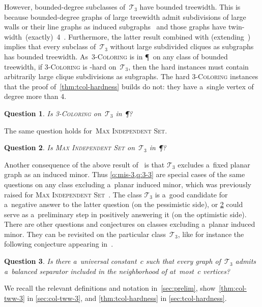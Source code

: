 \documentclass[a4paper,USenglish,cleveref,hyperref,autoref]{lipics-v2021}
\newcommand{\mis}{\textsc{Max Independent Set}\xspace}
\newcommand{\tcol}{\textsc{3-Coloring}\xspace}
\newtheorem{question}{Question}%
\begin{document}
However, bounded-degree subclasses of~$\mathcal T_3$ have bounded treewidth. 
This is because bounded-degree graphs of large treewidth admit subdivisions of large walls or their line graphs as induced subgraphs~\cite{Korhonen23} and those graphs have twin-width~(exactly)~4~\cite{Ahn25}.
Furthermore, the latter result combined with \cite{Abrishami24,Bonnet25} (extending~\cite{Korhonen23}) implies that every subclass of~$\mathcal T_3$ without large subdivided cliques as subgraphs has bounded treewidth.
As~\tcol is in \P\ on any class of bounded treewidth, if \tcol is \NP-hard on~$\mathcal T_3$, then the hard instances must contain arbitrarily large clique subdivisions as subgraphs. 
The hard \tcol instances that the proof of~\cref{thm:tcol-hardness} builds do not: they have a~single vertex of degree more than 4.

\begin{question}\label{q:3-3}
  Is \tcol on~$\mathcal T_3$ in \P?
\end{question}

The same question holds for~\mis.

\begin{question}\label{q:mis-3}
  Is \mis on~$\mathcal T_3$ in \P?
\end{question}

Another consequence of the above result of~\cite{Ahn25} is that $\mathcal T_3$ excludes a~fixed planar graph as an induced minor.
Thus \cref{q:mis-3,q:3-3} are special cases of the same questions on any class excluding a~planar induced minor, which was previously raised for \mis~\cite{Dallard24}.
The class $\mathcal T_3$ is a~good candidate for a~negative answer to the latter question (on the pessimistic side), or \cref{q:mis-3} could serve as a~preliminary step in positively answering it (on the optimistic side).
There are other questions and conjectures on classes excluding a~planar induced minor.
They can be revisited on the particular class~$\mathcal T_3$, like for instance the following conjecture appearing in~\cite{GartlandThesis}.

\begin{question}\label{q:bal-sep}
 Is there a~universal constant~$c$ such that every graph of~$\mathcal T_3$ admits a~balanced separator included in the neighborhood of at~most~$c$ vertices?
\end{question}

We recall the relevant definitions and notation in~\cref{sec:prelim}, show~\cref{thm:col-tww-3} in \cref{sec:col-tww-3}, and \cref{thm:tcol-hardness} in \cref{sec:tcol-hardness}.
\end{document}
